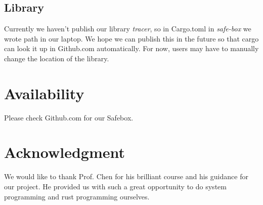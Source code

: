 \documentclass[conference,compsoc]{IEEEtran}
\begin{document}
	\subsection{Library}
		\par
			Currently we haven't publish our library \emph{tracer}, so in Cargo.toml in \emph{safe-box} we wrote path in our laptop.
			We hope we can publish this in the future so that cargo can look it up in Github.com automatically.
			For now, users may have to manually change the location of the library.


\section{Availability}

	Please check Github.com for our Safebox.

\section*{Acknowledgment}
	We would like to thank Prof. Chen for his brilliant course and his guidance for our project. He provided us with such a great opportunity to do system programming and rust programming ourselves. 





\end{document}
